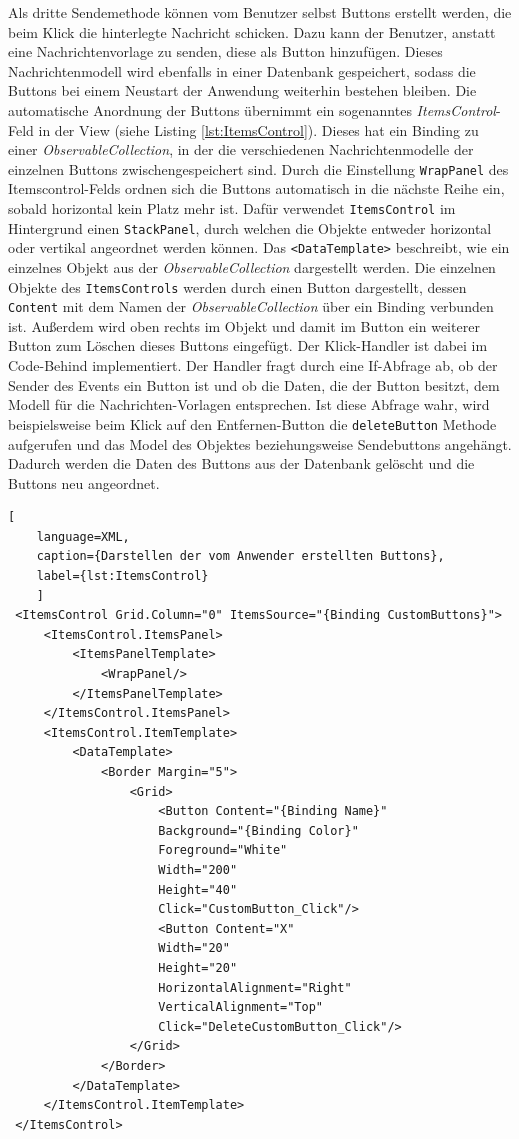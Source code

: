  Als dritte Sendemethode können vom Benutzer selbst Buttons erstellt werden, die beim Klick die hinterlegte Nachricht schicken. Dazu kann der Benutzer, anstatt eine Nachrichtenvorlage zu senden, diese als Button hinzufügen. Dieses Nachrichtenmodell wird ebenfalls in einer Datenbank gespeichert, sodass die Buttons bei einem Neustart der Anwendung weiterhin bestehen bleiben. Die automatische Anordnung der Buttons übernimmt ein sogenanntes \textit{ItemsControl}-Feld in der View (siehe Listing \ref{lst:ItemsControl}). Dieses hat ein Binding zu einer \textit{ObservableCollection}, in der die verschiedenen Nachrichtenmodelle der einzelnen Buttons zwischengespeichert sind. Durch die Einstellung \lstinline|WrapPanel| des Itemscontrol-Felds ordnen sich die Buttons
 automatisch in die nächste Reihe ein, sobald horizontal kein Platz mehr ist. Dafür verwendet \lstinline{ItemsControl} im Hintergrund einen \lstinline{StackPanel}, durch welchen die Objekte entweder horizontal oder vertikal angeordnet werden können. Das \lstinline{<DataTemplate>} beschreibt, wie ein einzelnes Objekt aus der \textit{ObservableCollection} dargestellt werden. Die einzelnen Objekte des \lstinline{ItemsControls} werden durch einen Button dargestellt, dessen \lstinline|Content| mit dem Namen der \textit{ObservableCollection} über ein Binding verbunden ist.  Außerdem wird oben rechts im Objekt und damit im Button ein weiterer Button zum Löschen dieses Buttons eingefügt. Der Klick-Handler ist dabei im Code-Behind implementiert. Der Handler fragt durch eine If-Abfrage ab, ob der Sender des Events ein Button ist und ob die Daten, die der Button besitzt, dem Modell für die Nachrichten-Vorlagen entsprechen. Ist diese Abfrage wahr, wird beispielsweise beim Klick auf den Entfernen-Button die \lstinline|deleteButton| Methode aufgerufen und das Model des Objektes beziehungsweise Sendebuttons angehängt. Dadurch werden die Daten des Buttons aus der Datenbank gelöscht und die Buttons neu angeordnet.
  \begin{lstlisting}[
    language=XML,
    caption={Darstellen der vom Anwender erstellten Buttons},
    label={lst:ItemsControl}
    ]
 <ItemsControl Grid.Column="0" ItemsSource="{Binding CustomButtons}">
     <ItemsControl.ItemsPanel>
         <ItemsPanelTemplate>
             <WrapPanel/>
         </ItemsPanelTemplate>
     </ItemsControl.ItemsPanel>
     <ItemsControl.ItemTemplate>
         <DataTemplate>
             <Border Margin="5">
                 <Grid>
                     <Button Content="{Binding Name}"
                     Background="{Binding Color}"
                     Foreground="White"
                     Width="200"
                     Height="40"
                     Click="CustomButton_Click"/>
                     <Button Content="X"
                     Width="20"
                     Height="20"
                     HorizontalAlignment="Right"
                     VerticalAlignment="Top"
                     Click="DeleteCustomButton_Click"/>
                 </Grid>
             </Border>
         </DataTemplate>
     </ItemsControl.ItemTemplate>
 </ItemsControl>
\end{lstlisting}

